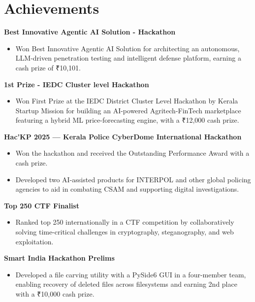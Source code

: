 \documentclass[10pt, a4paper]{article}
\newenvironment{highlights}{
    \begin{itemize}[
        topsep=0.10 cm,
        parsep=0.10 cm,
        partopsep=0pt,
        itemsep=0pt,
        leftmargin=0 cm + 10pt
    ]
}{
    \end{itemize}
} %
\begin{document}
    \section{Achievements}

                \textbf{Best Innovative Agentic AI Solution - Hackathon}
                \begin{highlights}
                    \item Won Best Innovative Agentic AI Solution for architecting an autonomous, LLM-driven penetration testing and intelligent defense platform, earning a cash prize of ₹10,101.
                \end{highlights}

                \textbf{1st Prize - IEDC Cluster level Hackathon}
              \begin{highlights}
                  \item Won First Prize at the IEDC District Cluster Level Hackathon by Kerala Startup Mission for building an AI-powered Agritech-FinTech marketplace featuring a hybrid ML price-forecasting engine, with a ₹12,000 cash prize.
              \end{highlights}

                \textbf{Hac'KP 2025 — Kerala Police CyberDome International Hackathon}
                \begin{highlights}
                    \item Won the hackathon and received the Outstanding Performance Award with a cash prize.
                    \item Developed two AI-assisted products for INTERPOL and other global policing agencies to aid in combating CSAM and supporting digital investigations.
                \end{highlights}

                \textbf{Top 250 CTF Finalist}
            \begin{highlights}
                \item Ranked top 250 internationally in a CTF competition by collaboratively solving time-critical challenges in cryptography, steganography, and web exploitation.
            \end{highlights}

                \textbf{Smart India Hackathon Prelims}
                \begin{highlights}
                    \item Developed a file carving utility with a PySide6 GUI in a four-member team, enabling recovery of deleted files across filesystems and earning 2nd place with a ₹10,000 cash prize.
                \end{highlights}
                
\end{document}
